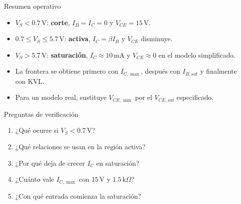 \documentclass[aspectratio=169]{beamer}
\begin{document}
\begin{frame}{Resumen operativo}
  \begin{itemize}
    \item $V_S<0.7\,\mathrm{V}$: \textbf{corte}, $I_B=I_C=0$ y $V_{CE}=15\,\mathrm{V}$.
    \item $0.7\le V_S\le5.7\,\mathrm{V}$: \textbf{activa}, $I_C=\beta I_B$ y $V_{CE}$ disminuye.
    \item $V_S>5.7\,\mathrm{V}$: \textbf{saturación}, $I_C\approx10\,\mathrm{mA}$ y
      $V_{CE}\approx0$ en el modelo simplificado.
    \item La frontera se obtiene primero con $I_{C,\max}$, después con $I_{B,sat}$ y finalmente con KVL.
    \item Para un modelo real, sustituye $V_{CE,\min}$ por el $V_{CE,sat}$ especificado.
  \end{itemize}
\end{frame}

\begin{frame}{Preguntas de verificación}
  \begin{enumerate}
    \item ¿Qué ocurre si $V_S<0.7\,\mathrm{V}$?
    \item ¿Qué relaciones se usan en la región activa?
    \item ¿Por qué deja de crecer $I_C$ en saturación?
    \item ¿Cuánto vale $I_{C,\max}$ con $15\,\mathrm{V}$ y $1.5\,\mathrm{k}\Omega$?
    \item ¿Con qué entrada comienza la saturación?
  \end{enumerate}
\end{frame}
\end{document}
